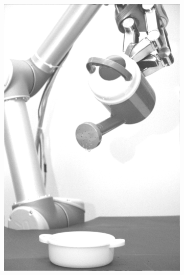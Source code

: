 \begin{figure}[H]
\begin{subfigure}[b]{0.1\textwidth}
        \includegraphics[width=\textwidth]{img3/test/contrast_5_1_2_final_img3.png}
    \end{subfigure}
        \begin{subfigure}[b]{0.1\textwidth}

\end{subfigure}
\end{figure}

